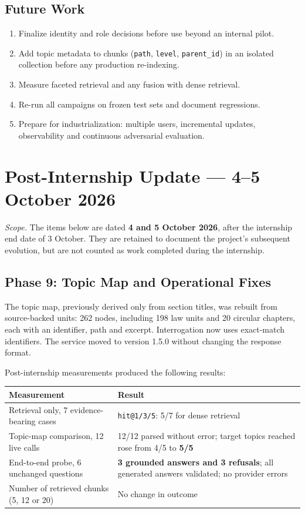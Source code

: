 \documentclass[a4paper,12pt,openany]{report}
\begin{document}
\section*{Future Work}
\begin{enumerate}
  \item Finalize identity and role decisions before use beyond an internal pilot.
  \item Add topic metadata to chunks (\texttt{path}, \texttt{level}, \texttt{parent\_id}) in an
isolated collection before any production re-indexing.
  \item Measure faceted retrieval and any fusion with dense retrieval.
  \item Re-run all campaigns on frozen test sets and document regressions.
  \item Prepare for industrialization: multiple users, incremental updates, observability and
continuous adversarial evaluation.
\end{enumerate}

\chapter*{Post-Internship Update — 4--5 October 2026}

\emph{Scope.} The items below are dated \textbf{4 and 5 October 2026}, after the internship end
date of 3 October. They are retained to document the project's subsequent evolution, but are not
counted as work completed during the internship.

\section*{Phase 9: Topic Map and Operational Fixes}
The topic map, previously derived only from section titles, was rebuilt from source-backed units:
262 nodes, including 198 law units and 20 circular chapters, each with an identifier, path and
excerpt. Interrogation now uses exact-match identifiers. The service moved to version 1.5.0 without
changing the response format.

Post-internship measurements produced the following results:
\begin{table}[htbp]
\centering
\small
\begin{tabular}{p{6.2cm}p{8.3cm}}
\toprule
\textbf{Measurement} & \textbf{Result} \\
\midrule
Retrieval only, 7 evidence-bearing cases & \texttt{hit@1/3/5}: 5/7 for dense retrieval \\
Topic-map comparison, 12 live calls & 12/12 parsed without error; target topics reached rose
from 4/5 to \textbf{5/5} \\
End-to-end probe, 6 unchanged questions & \textbf{3 grounded answers and 3 refusals}; all
generated answers validated; no provider errors \\
Number of retrieved chunks (5, 12 or 20) & No change in outcome \\
\bottomrule
\end{tabular}
\end{table}
\end{document}
